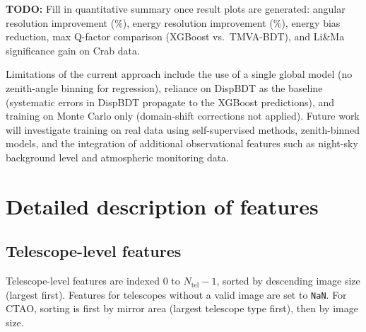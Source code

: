 \documentclass[12pt]{article}
\newcommand{\todo}[1]{\begin{hintBox} \textbf{TODO:} #1 \end{hintBox}}
\begin{document}
\todo{Fill in quantitative summary once result plots are generated: angular resolution improvement (\%), energy resolution improvement (\%), energy bias reduction, max Q-factor comparison (XGBoost vs.\ TMVA-BDT), and Li\&Ma significance gain on Crab data.}

Limitations of the current approach include the use of a single global model
(no zenith-angle binning for regression), reliance on DispBDT as the baseline
(systematic errors in DispBDT propagate to the XGBoost predictions),
and training on Monte Carlo only (domain-shift corrections not applied).
Future work will investigate training on real data using self-supervised methods,
zenith-binned models, and the integration of additional observational features
such as night-sky background level and atmospheric monitoring data.



\section{Detailed description of features}
\label{sec:appendix_features}

\subsection{Telescope-level features}

Telescope-level features are indexed 0 to $N_\mathrm{tel}-1$, sorted by descending
image size (largest first). Features for telescopes without a valid image are set to \texttt{NaN}.
For CTAO, sorting is first by mirror area (largest telescope type first), then by image size.
\end{document}

